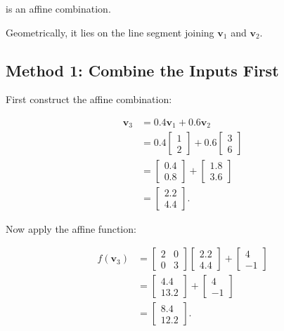 \documentclass[12pt]{article}
\newcommand{\Vector}[1]{\mathbf{#1}}
\begin{document}
is an affine combination.

Geometrically, it lies on the line segment joining
$\Vector{v}_1$ and $\Vector{v}_2$.

\subsection{Method 1: Combine the Inputs First}
First construct the affine combination:

\begin{align*}
\Vector{v}_3
&=
0.4\Vector{v}_1+0.6\Vector{v}_2
\\[4pt]
&=
0.4
\begin{bmatrix}
1\\
2
\end{bmatrix}
+
0.6
\begin{bmatrix}
3\\
6
\end{bmatrix}
\\[6pt]
&=
\begin{bmatrix}
0.4\\
0.8
\end{bmatrix}
+
\begin{bmatrix}
1.8\\
3.6
\end{bmatrix}
\\[6pt]
&=
\begin{bmatrix}
2.2\\
4.4
\end{bmatrix}.
\end{align*}

Now apply the affine function:

\begin{align*}
f(\Vector{v}_3)
&=
\begin{bmatrix}
2 & 0\\
0 & 3
\end{bmatrix}
\begin{bmatrix}
2.2\\
4.4
\end{bmatrix}
+
\begin{bmatrix}
4\\
-1
\end{bmatrix}
\\[6pt]
&=
\begin{bmatrix}
4.4\\
13.2
\end{bmatrix}
+
\begin{bmatrix}
4\\
-1
\end{bmatrix}
\\[6pt]
&=
\boxed{
\begin{bmatrix}
8.4\\
12.2
\end{bmatrix}
}.
\end{align*}
\end{document}

